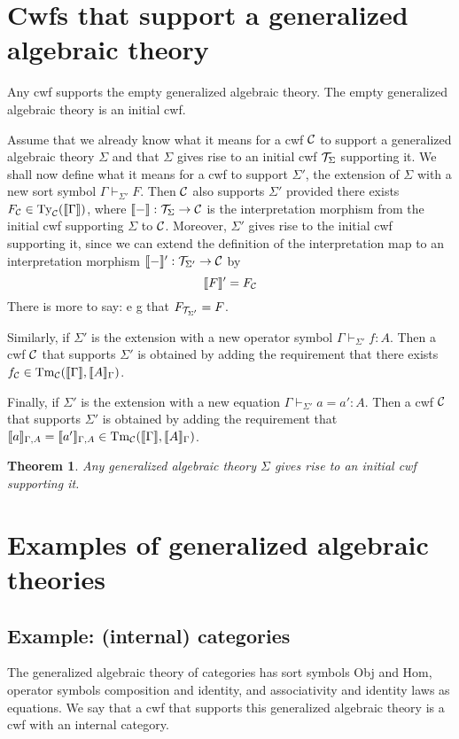\documentclass{lmcs}
\newtheorem{theorem}{Theorem}
\begin{document}
\section{Cwfs that support a generalized algebraic theory}

Any cwf supports the empty generalized algebraic theory. The empty generalized algebraic theory is an initial cwf.

Assume that we already know what it means for a cwf ${\mathcal C}$ to support a generalized algebraic theory $\Sigma$ and that $\Sigma$ gives rise to an initial cwf ${\mathcal T}_\Sigma$ supporting it. We shall now define what it means for a cwf to support $\Sigma'$, the extension of $\Sigma$ with a new sort symbol $\Gamma \vdash_{\Sigma'} F$. Then ${\mathcal C}$ also supports $\Sigma'$ provided there exists $F_{{\mathcal C}} \in \mathrm{Ty}_{\mathcal C}(\llbracket \Gamma \rrbracket)$, where $\llbracket - \rrbracket : {\mathcal T}_\Sigma \to {\mathcal C}$ is the interpretation morphism from the initial cwf supporting $\Sigma$ to ${\mathcal C}$. Moreover, $\Sigma'$ gives rise to the initial cwf supporting it, since we can extend the definition of the interpretation map to an interpretation morphism $\llbracket - \rrbracket' : {\mathcal T}_{\Sigma'} \to {\mathcal C}$ by 
$$
\llbracket F \rrbracket' = F_{\mathcal C}
$$
There is more to say: e g that $F_{{\mathcal T}_{\Sigma'}} = F$.

Similarly, if $\Sigma'$ is the extension with a new operator symbol $\Gamma \vdash_{\Sigma'} f : A$. Then a cwf ${\mathcal C}$ that supports $\Sigma'$ is obtained by adding the requirement that there exists $f_{\mathcal C} \in\mathrm{Tm}_{\mathcal C}(\llbracket \Gamma \rrbracket,\llbracket A \rrbracket_{\Gamma})$.

Finally, if $\Sigma'$ is the extension with a new equation $\Gamma \vdash_{\Sigma'} a = a': A$. Then a cwf ${\mathcal C}$ that supports $\Sigma'$ is obtained by adding the requirement that $\llbracket a \rrbracket_{\Gamma,A}= \llbracket a' \rrbracket_{\Gamma,A} \in \mathrm{Tm}_{\mathcal C}(\llbracket \Gamma \rrbracket,\llbracket A \rrbracket_\Gamma)$.

\begin{theorem}
Any generalized algebraic theory $\Sigma$ gives rise to an initial cwf supporting it.
\end{theorem}




\section{Examples of generalized algebraic theories}

\subsection{Example: (internal) categories} The generalized algebraic theory of categories has sort symbols Obj and Hom, operator symbols composition and identity, and associativity and identity laws as equations. We say that a cwf that supports this generalized algebraic theory is a cwf with an internal category.
\end{document}
